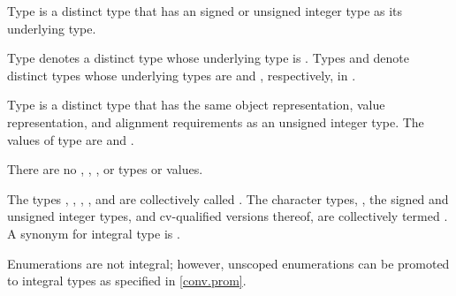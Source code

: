 \pnum
{}%
%
%
Type  is a distinct type that has
an 
signed or unsigned integer type as its underlying type.

\pnum
{}%
%
%
Type  denotes a distinct type
whose underlying type is .
%
%
%
%
%
%
Types  and  denote distinct types
whose underlying types are  and ,
respectively, in .

\pnum
{}%
%
Type  is a distinct type that has
the same object representation,
value representation, and
alignment requirements as
an  unsigned integer type.
The values of type  are
 and .
\begin{note}
There are no , ,
, or  types or values.
\end{note}

\pnum
{}%
The types , ,
, , and 
are collectively called .
The character types, ,
the signed and unsigned integer types,
and cv-qualified versions thereof,
are collectively termed
.
A synonym for integral type is .
\begin{note}
Enumerations are not integral;
however, unscoped enumerations can be promoted to integral types
as specified in \ref{conv.prom}.
\end{note}


